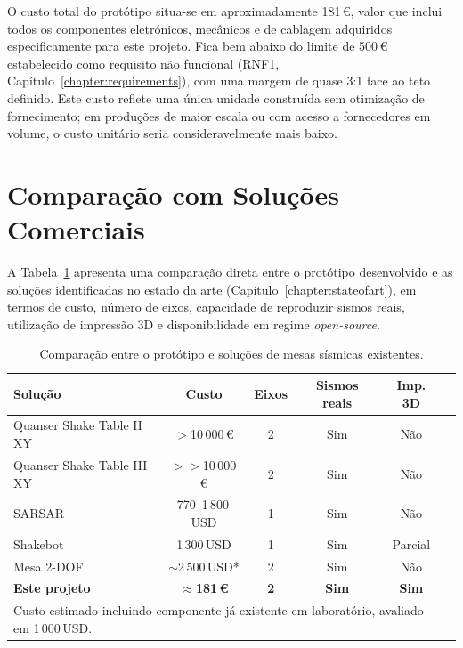 O custo total do protótipo situa-se em aproximadamente 181\,\euro{}, valor que inclui todos os componentes eletrónicos, mecânicos e de cablagem adquiridos especificamente para este projeto. Fica bem abaixo do limite de 500\,\euro{} estabelecido como requisito não funcional (RNF1, Capítulo~\ref{chapter:requirements}), com uma margem de quase 3:1 face ao teto definido. Este custo reflete uma única unidade construída sem otimização de fornecimento; em produções de maior escala ou com acesso a fornecedores em volume, o custo unitário seria consideravelmente mais baixo.

\section{Comparação com Soluções Comerciais}
\label{sec:comparacao-comercial}

A Tabela~\ref{tab:comparacao-custos} apresenta uma comparação direta entre o protótipo desenvolvido e as soluções identificadas no estado da arte (Capítulo~\ref{chapter:stateofart}), em termos de custo, número de eixos, capacidade de reproduzir sismos reais, utilização de impressão 3D e disponibilidade em regime \textit{open-source}.

\begin{table}[h]
\centering
\caption{Comparação entre o protótipo e soluções de mesas sísmicas existentes.}
\label{tab:comparacao-custos}
\begin{tabular}{lccccc}
\hline
\textbf{Solução} & \textbf{Custo} & \textbf{Eixos} & \textbf{Sismos reais} & \textbf{Imp. 3D} \\
\hline
Quanser Shake Table II XY~\cite{QuanserShakeTableIIXY} & $>$10\,000\,\euro{} & 2 & Sim & Não \\
Quanser Shake Table III XY~\cite{QuanserShakeTableIII} & $>>$10\,000\,\euro{} & 2 & Sim & Não \\
SARSAR~\cite{Damci2018}                                & 770--1\,800\,USD   & 1 & Sim & Não \\
Shakebot~\cite{Shakebot2022}                           & 1\,300\,USD        & 1 & Sim & Parcial \\
Mesa 2-DOF~\cite{2DOF2025}                             & $\sim$2\,500\,USD* & 2 & Sim & Não \\
\textbf{Este projeto}                                  & \textbf{$\approx$181\,\euro{}} & \textbf{2} & \textbf{Sim} & \textbf{Sim} \\
\hline
\multicolumn{5}{l}{\footnotesize * Custo estimado incluindo componente já existente em laboratório, avaliado em 1\,000\,USD.} \\
\end{tabular}
\end{table}

